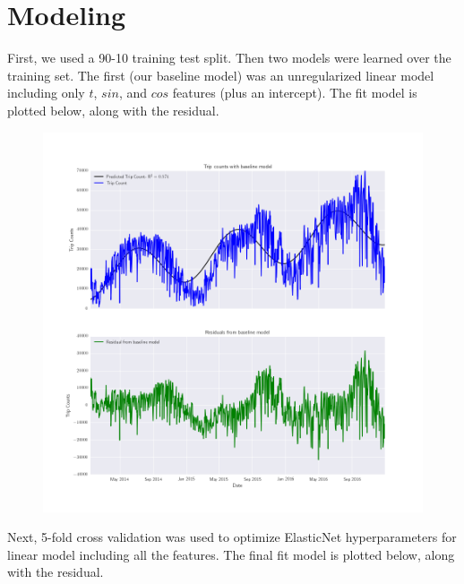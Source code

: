 \documentclass[12pt]{article}
\begin{document}
\section{Modeling}

First, we used a 90-10 training test split. Then two models were learned over the training set. The first (our baseline model) was an unregularized linear model including only $t$, $sin$, and $cos$ features (plus an intercept). The fit model is plotted below, along with the residual.

\begin{figure}[H]
   \centering
   \includegraphics[width=\textwidth]{figures/baseline_plot.png}
  \end{figure}

Next, 5-fold cross validation was used to optimize ElasticNet hyperparameters for linear model including all the features. The final fit model is plotted below, along with the residual.
\end{document}

